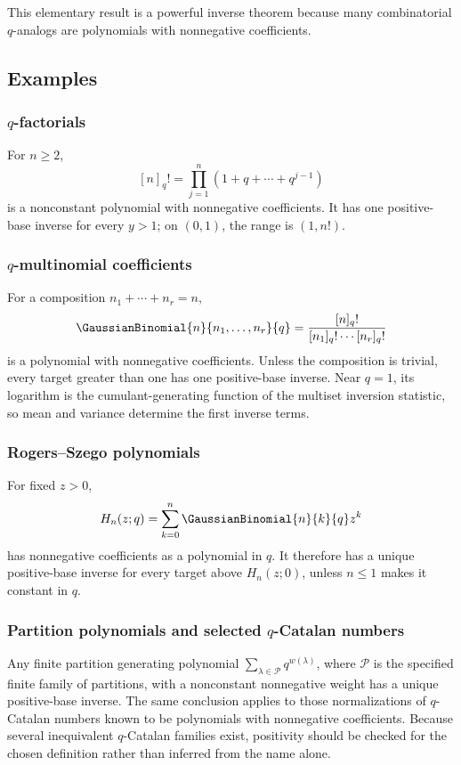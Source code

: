\documentclass[11pt,oneside]{article}
\theoremstyle{definition}
\theoremstyle{remark}
\theoremstyle{plain}
\theoremstyle{definition}
\theoremstyle{remark}
\numberwithin{equation}{section}
\numberwithin{figure}{section}
\numberwithin{table}{section}
\let\reportsubsection\subsection
\let\reportsubsubsection\subsubsection
\let\section\reportsubsection
\let\subsection\reportsubsubsection
\begin{document}
This elementary result is a powerful inverse theorem because many combinatorial
\(q\)-analogs are polynomials with nonnegative coefficients.

\section{Examples}
\subsection{\(q\)-factorials}
For \(n\ge2\),
\[
 [n]_q!=\prod_{j=1}^n(1+q+\cdots+q^{j-1})
\]
is a nonconstant polynomial with nonnegative coefficients.  It has one
positive-base inverse for every \(y>1\); on \((0,1)\), the range is
\((1,n!)\).

\subsection{\(q\)-multinomial coefficients}
For a composition \(n_1+\cdots+n_r=n\),
\[
 \GaussianBinomial{n}{n_1,\ldots,n_r}{q}
 =\frac{[n]_q!}{[n_1]_q!\cdots[n_r]_q!}
\]
is a polynomial with nonnegative coefficients.  Unless the composition is
trivial, every target greater than one has one positive-base inverse.  Near
\(q=1\), its logarithm is the cumulant-generating function of the multiset
inversion statistic, so mean and variance determine the first inverse terms.

\subsection{Rogers--Szego polynomials}
For fixed \(z>0\),
\[
 H_n(z;q)=\sum_{k=0}^n\GaussianBinomial{n}{k}{q} z^k
\]
has nonnegative coefficients as a polynomial in \(q\).  It therefore has a
unique positive-base inverse for every target above \(H_n(z;0)\), unless
\(n\le1\) makes it constant in \(q\).

\subsection{Partition polynomials and selected \(q\)-Catalan numbers}
Any finite partition generating polynomial
\(\sum_{\lambda\in\mathscr P}q^{w(\lambda)}\), where \(\mathscr P\) is the
specified finite family of partitions, with a nonconstant nonnegative
weight has a unique positive-base inverse.  The same conclusion applies to
those normalizations of \(q\)-Catalan numbers known to be polynomials with
nonnegative coefficients.  Because several inequivalent \(q\)-Catalan
families exist, positivity should be checked for the chosen definition rather
than inferred from the name alone.
\end{document}
